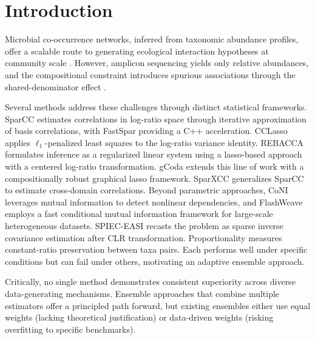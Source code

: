 \documentclass[unnumsec,webpdf,contemporary,large,numbered]{oup-authoring-template}
\theoremstyle{plain}
\theoremstyle{definition}
\begin{document}

\maketitle

\section{Introduction}\label{sec:intro}

Microbial co-occurrence networks, inferred from taxonomic abundance profiles, offer a scalable route to generating ecological interaction hypotheses at community scale \cite{friedman2012,kurtz2015}. However, amplicon sequencing yields only relative abundances, and the compositional constraint introduces spurious associations through the shared-denominator effect \cite{lovell2015,lin2020}.

Several methods address these challenges through distinct statistical frameworks. SparCC \cite{friedman2012} estimates correlations in log-ratio space through iterative approximation of basis correlations, with FastSpar \cite{watts2019} providing a C++ acceleration. CCLasso \cite{fang2015} applies $\ell_1$-penalized least squares to the log-ratio variance identity. REBACCA \cite{ban2015} formulates inference as a regularized linear system using a lasso-based approach with a centered log-ratio transformation. gCoda \cite{fang2017} extends this line of work with a compositionally robust graphical lasso framework. SparXCC \cite{jensen2024} generalizes SparCC to estimate cross-domain correlations. Beyond parametric approaches, CoNI \cite{klaus2022} leverages mutual information to detect nonlinear dependencies, and FlashWeave \cite{tackmann2019} employs a fast conditional mutual information framework for large-scale heterogeneous datasets. SPIEC-EASI \cite{kurtz2015} recasts the problem as sparse inverse covariance estimation after CLR transformation. Proportionality \cite{lovell2015} measures constant-ratio preservation between taxa pairs. Each performs well under specific conditions but can fail under others, motivating an adaptive ensemble approach.

Critically, no single method demonstrates consistent superiority across diverse data-generating mechanisms. Ensemble approaches that combine multiple estimators offer a principled path forward, but existing ensembles either use equal weights (lacking theoretical justification) or data-driven weights (risking overfitting to specific benchmarks).
\end{document}
